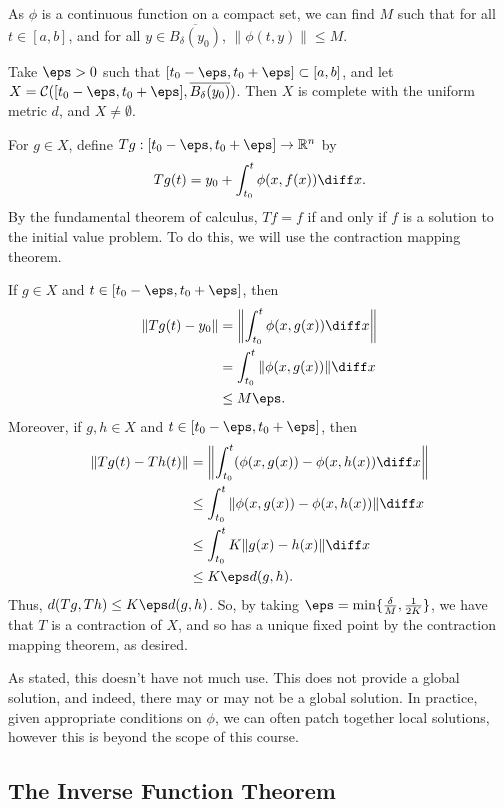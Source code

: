 \documentclass[12pt]{article}
\begin{document}
\begin{proofbox}
	As $\phi$ is a continuous function on a compact set, we can find $M$ such that for all $t \in [a, b]$, and for all $y \in \overline{B_{\delta}(y_0)}$, $\|\phi(t, y)\| \leq M$.

	Take $\eps > 0$ such that $[t_0 - \eps, t_0 + \eps] \subset [a, b]$, and let $X = \mathcal{C}([t_0 - \eps, t_0 + \eps], \overline{B_{\delta}(y_0)})$. Then $X$ is complete with the uniform metric $d$, and $X \neq \emptyset$.

	For $g \in X$, define $Tg : [t_0 - \eps, t_0 + \eps] \to \mathbb{R}^{n}$ by
	\[
	Tg(t) = y_0 + \int_{t_0}^{t} \phi(x, f(x)) \diff x
	.\]
	By the fundamental theorem of calculus, $Tf = f$ if and only if $f$ is a solution to the initial value problem. To do this, we will use the contraction mapping theorem.

	If $g \in X$ and $t \in [t_0 - \eps, t_0 + \eps]$, then
	\begin{align*}
	\|Tg(t) - y_0\| &= \biggl\| \int_{t_0}^{t} \phi(x, g(x)) \diff x \biggr\| \\
			&= \int_{t_0}^{t}\|\phi(x, g(x))\| \diff x \\
			&\leq M \eps.
	\end{align*}
	Moreover, if $g, h \in X$ and $t \in [t_0-\eps, t_0+\eps]$, then
	\begin{align*}
		\|Tg(t) - Th(t)\| &= \biggl\| \int_{t_0}^{t}(\phi(x, g(x)) - \phi(x, h(x)) \diff x \biggr\| \\
				  &\leq \int_{t_0}^{t} \| \phi(x, g(x)) - \phi(x, h(x)) \| \diff x \\
				  &\leq \int_{t_0}^{t}K\|g(x) - h(x)\| \diff x \\
				  &\leq K \eps d(g, h).
	\end{align*}
	Thus, $d(Tg, Th) \leq K \eps d(g, h)$. So, by taking $\eps = \min\{ \frac{\delta}{M}, \frac{1}{2K}\}$, we have that $T$ is a contraction of $X$, and so has a unique fixed point by the contraction mapping theorem, as desired.
\end{proofbox}

\begin{remark}
	As stated, this doesn't have not much use. This does not provide a global solution, and indeed, there may or may not be a global solution. In practice, given appropriate conditions on $\phi$, we can often patch together local solutions, however this is beyond the scope of this course.
\end{remark}

\subsection{The Inverse Function Theorem}
\label{sub:the_inverse_function_theorem}
\end{document}
